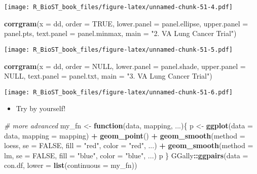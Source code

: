 \documentclass[
]{book}
\newenvironment{Shaded}{\begin{snugshade}}{\end{snugshade}}
\newcommand{\CommentTok}[1]{\textcolor[rgb]{0.56,0.35,0.01}{\textit{#1}}}
\newcommand{\ControlFlowTok}[1]{\textcolor[rgb]{0.13,0.29,0.53}{\textbf{#1}}}
\newcommand{\DataTypeTok}[1]{\textcolor[rgb]{0.13,0.29,0.53}{#1}}
\newcommand{\KeywordTok}[1]{\textcolor[rgb]{0.13,0.29,0.53}{\textbf{#1}}}
\newcommand{\NormalTok}[1]{#1}
\newcommand{\OperatorTok}[1]{\textcolor[rgb]{0.81,0.36,0.00}{\textbf{#1}}}
\newcommand{\OtherTok}[1]{\textcolor[rgb]{0.56,0.35,0.01}{#1}}
\newcommand{\StringTok}[1]{\textcolor[rgb]{0.31,0.60,0.02}{#1}}
\providecommand{\tightlist}{%
  \setlength{\itemsep}{0pt}\setlength{\parskip}{0pt}}
\begin{document}
\texttt{[image: R\_BioST\_book\_files/figure-latex/unnamed-chunk-51-4.pdf]}

\begin{Shaded}
\begin{Highlighting}[]
\KeywordTok{corrgram}\NormalTok{(}\DataTypeTok{x =}\NormalTok{ dd, }
         \DataTypeTok{order =} \OtherTok{TRUE}\NormalTok{, }
         \DataTypeTok{lower.panel =}\NormalTok{ panel.ellipse, }
         \DataTypeTok{upper.panel =}\NormalTok{ panel.pts, }
         \DataTypeTok{text.panel =}\NormalTok{ panel.minmax, }
         \DataTypeTok{main =} \StringTok{"2. VA Lung Cancer Trial"}\NormalTok{)}
\end{Highlighting}
\end{Shaded}

\texttt{[image: R\_BioST\_book\_files/figure-latex/unnamed-chunk-51-5.pdf]}

\begin{Shaded}
\begin{Highlighting}[]
\KeywordTok{corrgram}\NormalTok{(}\DataTypeTok{x =}\NormalTok{ dd, }
         \DataTypeTok{order =} \OtherTok{NULL}\NormalTok{, }
         \DataTypeTok{lower.panel =}\NormalTok{ panel.shade, }
         \DataTypeTok{upper.panel =} \OtherTok{NULL}\NormalTok{, }
         \DataTypeTok{text.panel =}\NormalTok{ panel.txt, }
         \DataTypeTok{main =} \StringTok{"3. VA Lung Cancer Trial"}\NormalTok{)}
\end{Highlighting}
\end{Shaded}

\texttt{[image: R\_BioST\_book\_files/figure-latex/unnamed-chunk-51-6.pdf]}

\begin{itemize}
\tightlist
\item
  Try by yourself!
\end{itemize}

\begin{Shaded}
\begin{Highlighting}[]
\CommentTok{\# more advanced}
\NormalTok{my\_fn \textless{}{-}}\StringTok{ }\ControlFlowTok{function}\NormalTok{(data, mapping, ...)\{}
\NormalTok{  p \textless{}{-}}\StringTok{ }\KeywordTok{ggplot}\NormalTok{(}\DataTypeTok{data =}\NormalTok{ data, }\DataTypeTok{mapping =}\NormalTok{ mapping) }\OperatorTok{+}\StringTok{ }
\StringTok{    }\KeywordTok{geom\_point}\NormalTok{() }\OperatorTok{+}\StringTok{ }
\StringTok{    }\KeywordTok{geom\_smooth}\NormalTok{(}\DataTypeTok{method =}\NormalTok{ loess, }\DataTypeTok{se =} \OtherTok{FALSE}\NormalTok{, }\DataTypeTok{fill =} \StringTok{"red"}\NormalTok{, }\DataTypeTok{color =} \StringTok{"red"}\NormalTok{, ...) }\OperatorTok{+}
\StringTok{    }\KeywordTok{geom\_smooth}\NormalTok{(}\DataTypeTok{method =}\NormalTok{ lm, }\DataTypeTok{se =} \OtherTok{FALSE}\NormalTok{, }\DataTypeTok{fill =} \StringTok{"blue"}\NormalTok{, }\DataTypeTok{color =} \StringTok{"blue"}\NormalTok{, ...)}
\NormalTok{  p}
\NormalTok{\}}
\NormalTok{GGally}\OperatorTok{::}\KeywordTok{ggpairs}\NormalTok{(}\DataTypeTok{data =}\NormalTok{ con.df, }
        \DataTypeTok{lower =} \KeywordTok{list}\NormalTok{(}\DataTypeTok{continuous =}\NormalTok{ my\_fn))}
\end{Highlighting}
\end{Shaded}
\end{document}
